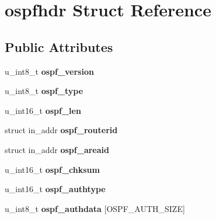 \hypertarget{structospfhdr}{
\section{ospfhdr Struct Reference}
\label{structospfhdr}
}
\subsection*{Public Attributes}
\begin{DoxyCompactItemize}
\item 
\hypertarget{structospfhdr_a506eed90b185e28a1143c42f927edcd3}{
u\_\-int8\_\-t {\bfseries ospf\_\-version}}
\label{structospfhdr_a506eed90b185e28a1143c42f927edcd3}

\item 
\hypertarget{structospfhdr_abf2a738d0f56c2f339699860516308ec}{
u\_\-int8\_\-t {\bfseries ospf\_\-type}}
\label{structospfhdr_abf2a738d0f56c2f339699860516308ec}

\item 
\hypertarget{structospfhdr_a96cf22b2c750ce643a9802cdd2c06b94}{
u\_\-int16\_\-t {\bfseries ospf\_\-len}}
\label{structospfhdr_a96cf22b2c750ce643a9802cdd2c06b94}

\item 
\hypertarget{structospfhdr_a61f887dc8222294aa26af1e3ffdf4c0b}{
struct in\_\-addr {\bfseries ospf\_\-routerid}}
\label{structospfhdr_a61f887dc8222294aa26af1e3ffdf4c0b}

\item 
\hypertarget{structospfhdr_a57dfba6775fc679066a9cff2645fbc93}{
struct in\_\-addr {\bfseries ospf\_\-areaid}}
\label{structospfhdr_a57dfba6775fc679066a9cff2645fbc93}

\item 
\hypertarget{structospfhdr_ac3a8068e1d3b138e510f90fdb0211ad5}{
u\_\-int16\_\-t {\bfseries ospf\_\-chksum}}
\label{structospfhdr_ac3a8068e1d3b138e510f90fdb0211ad5}

\item 
\hypertarget{structospfhdr_aa6f1884c9b43e4a499193a4a8ada14e7}{
u\_\-int16\_\-t {\bfseries ospf\_\-authtype}}
\label{structospfhdr_aa6f1884c9b43e4a499193a4a8ada14e7}

\item 
\hypertarget{structospfhdr_abf41ad2f881bd10d1eabd83d6153fc9e}{
u\_\-int8\_\-t {\bfseries ospf\_\-authdata} \mbox{[}OSPF\_\-AUTH\_\-SIZE\mbox{]}}
\label{structospfhdr_abf41ad2f881bd10d1eabd83d6153fc9e}


\end{DoxyCompactItemize}
